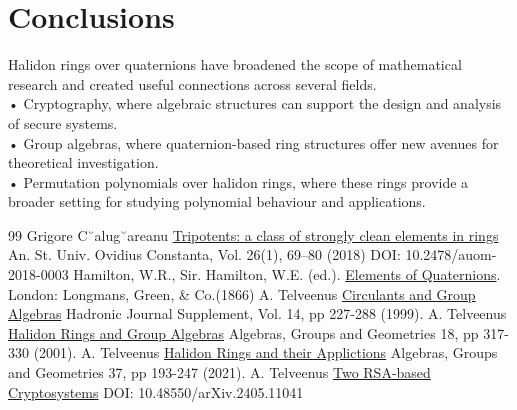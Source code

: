 \documentclass[sn-mathphys,Numbered]{sn-jnl}%
\theoremstyle{thmstyleone}
\theoremstyle{thmstyletwo}
\theoremstyle{thmstylethree}
\begin{document}
\section{Conclusions}
Halidon rings over quaternions have broadened the scope of mathematical research and created useful connections across several fields. \\
•	Cryptography, where algebraic structures can support the design and analysis of secure systems. \\
•	Group algebras, where quaternion-based ring structures offer new avenues for theoretical investigation. \\
•	Permutation polynomials over halidon rings, where these rings provide a broader setting for studying polynomial behaviour and applications. \\
\begin{thebibliography}{99}
Grigore C˘alug˘areanu
\href{https://www.math.ubbcluj.ro/~calu/tridOv.pdf}{Tripotents: a class of strongly clean elements in
rings} An. St. Univ. Ovidius Constanta, Vol. 26(1), 69–80 (2018) DOI: 10.2478/auom-2018-0003
Hamilton, W.R., Sir. Hamilton, W.E. (ed.).
\href{https://archive.org/details/elementsofquater00hamiuoft/page/44/mode/2up}{Elements of Quaternions}. London: Longmans, Green, \& Co.(1866)
A. Telveenus
\href{https://www.researchgate.net/publication/268021180_Halidon_rings_and_group_algebras}{Circulants and Group Algebras}
Hadronic Journal Supplement, Vol. 14, pp 227-288 (1999).
A. Telveenus
\href{https://www.researchgate.net/publication/268021180_Halidon_rings_and_group_algebras}{Halidon Rings and Group Algebras}
Algebras, Groups and Geometries 18, pp 317-330 (2001).
A. Telveenus
\href{https://www.researchgate.net/publication/358271506_Halidon_Rings_and_their_Applications}{Halidon Rings and their Applictions}
Algebras, Groups and Geometries 37, pp 193-247 (2021).
A. Telveenus
\href{https://www.researchgate.net/publication/380731221_Two_RSA-based_Cryptosystems}{Two RSA-based Cryptosystems}
DOI: 10.48550/arXiv.2405.11041
\end{thebibliography}
\end{document}
